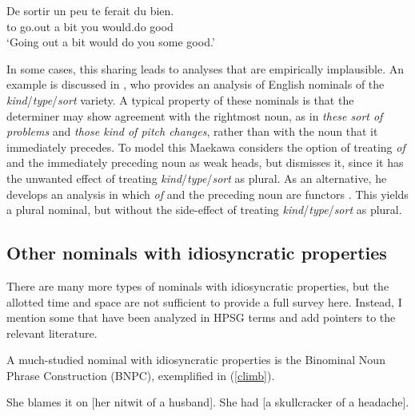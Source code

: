 \documentclass[output=paper
	        ,collection
	        ,collectionchapter
 	        ,biblatex
                ,babelshorthands
                ,newtxmath
                ,draftmode
                ,colorlinks, citecolor=brown
]{langscibook}
\begin{document}
\begin{exe} 
\ex\label{sorti}   
\gll   De sortir un peu te ferait du bien.  \\
       to go.out a bit you would.do {} good \\
\trans `Going out a bit would do you some good.'
\end{exe}  

\noindent
In some cases, this sharing leads to analyses that are empirically implausible. 
An example is discussed in \citet{Maekawa15}, who provides  
an analysis of English nominals of the \emph{kind}/\emph{type}/\emph{sort} variety.  
A typical property of these nominals is that the determiner may show agreement with the 
rightmost noun, as in \emph{these sort of problems} and \emph{those kind of pitch changes},
rather than with the noun that it immediately precedes. 
To model this Maekawa considers the option of treating \emph{of} and the immediately 
preceding noun as weak heads, but dismisses it, since it has the unwanted effect of treating 
\emph{kind}/\emph{type}/\emph{sort} as plural. 
As an alternative, he develops an analysis in which \emph{of} and 
the preceding noun are functors \citep[149]{Maekawa15}. This yields a plural nominal, but 
without the side-effect of treating \emph{kind}/\emph{type}/\emph{sort} as plural. 


\subsection{Other nominals with idiosyncratic properties} 
\label{other}


There are many more types of nominals with idiosyncratic properties,
but the allotted time and space are not sufficient to provide a full survey here. 
Instead, I mention some that have been analyzed in HPSG terms and add pointers 
to the relevant literature.    

A much-studied nominal with idiosyncratic properties is the Binominal Noun Phrase 
Construction (BNPC), exemplified in (\ref{climb}). 

\begin{exe}
\ex\label{climb}
\begin{xlist}
\ex  She blames it on [her nitwit of a husband]. 
\ex  She had [a skullcracker of a headache]. 
\end{xlist}
\end{exe}
\end{document}
